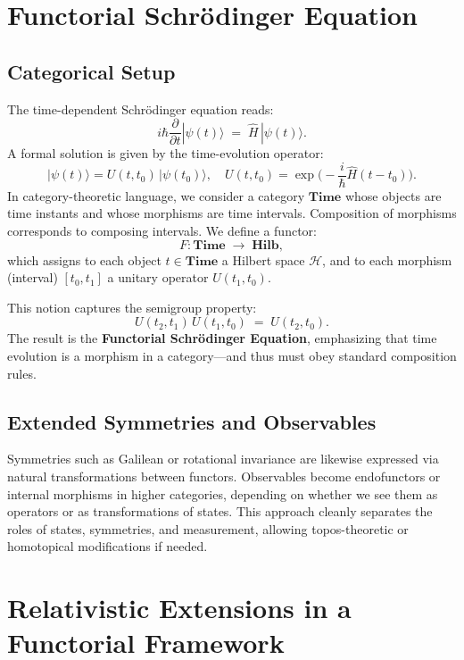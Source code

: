 \documentclass[12pt]{article}
\begin{document}
\section{Functorial Schr\"odinger Equation}
\subsection{Categorical Setup}
The time-dependent Schr\"odinger equation reads:
\begin{equation}\label{eq:TDSE}
i\hbar \frac{\partial}{\partial t}|\psi(t)\rangle \;=\; \hat{H}\,|\psi(t)\rangle.
\end{equation}
A formal solution is given by the time-evolution operator:
\[
|\psi(t)\rangle = U(t,t_0)\,|\psi(t_0)\rangle,\quad U(t,t_0) = \exp\!\Big(-\frac{i}{\hbar}\hat{H}(t-t_0)\Big).
\]
In category-theoretic language, we consider a category \(\mathbf{Time}\) whose objects are time instants and whose morphisms are time intervals. Composition of morphisms corresponds to composing intervals. We define a functor:
\[
F: \mathbf{Time} \;\longrightarrow\; \mathbf{Hilb},
\]
which assigns to each object \(t\in \mathbf{Time}\) a Hilbert space \(\mathcal{H}\), and to each morphism (interval) \([t_0, t_1]\) a unitary operator \(U(t_1,t_0)\).

This notion captures the semigroup property:
\[
U(t_2,t_1)\, U(t_1,t_0) \;=\; U(t_2,t_0).
\]
The result is the \textbf{Functorial Schr\"odinger Equation}, emphasizing that time evolution is a morphism in a category---and thus must obey standard composition rules.

\subsection{Extended Symmetries and Observables}
Symmetries such as Galilean or rotational invariance are likewise expressed via natural transformations between functors. Observables become endofunctors or internal morphisms in higher categories, depending on whether we see them as operators or as transformations of states. This approach cleanly separates the roles of states, symmetries, and measurement, allowing topos-theoretic or homotopical modifications if needed.

\section{Relativistic Extensions in a Functorial Framework}
\end{document}

